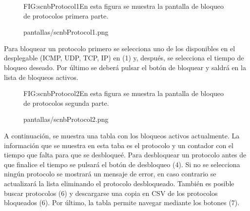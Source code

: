 \begin{figure}[Pantalla de bloqueo de protocolos parte 1]{FIG:scnbProtocol1}{En esta figura se muestra la pantalla de bloqueo de protocolos primera parte.}
  \begin{image}{}{}{pantallas/scnbProtocol1.png}
  \end{image}
\end{figure}

Para bloquear un protocolo primero se selecciona uno de los disponibles en el desplegable (ICMP, UDP, TCP, IP) en (1) y, después, se selecciona el tiempo de bloqueo deseado. Por último se deberá pulsar el botón de bloquear y saldrá en la lista de bloqueos activos.

\begin{figure}[Pantalla de bloqueo de protocolos parte 2]{FIG:scnbProtocol2}{En esta figura se muestra la pantalla de bloqueo de protocolos segunda parte.}
  \begin{image}{}{}{pantallas/scnbProtocol2.png}
  \end{image}
\end{figure}

A continuación, se muestra una tabla con los bloqueos activos actualmente. La información que se muestra en esta taba es el protocolo y un contador con el tiempo que falta para que se desbloqueé. Para desbloquear un protocolo antes de que finalice el tiempo se pulsará el botón de desbloqueo (4). Si no se selecciona ningún protocolo se mostrará un mensaje de error, en caso contrario se actualizará la lista eliminando el protocolo desbloqueado. También es posible buscar protocolos (6) y descargarse una copia en CSV de los protocolos bloqueados (6). Por último, la tabla permite navegar mediante los botones (7). 